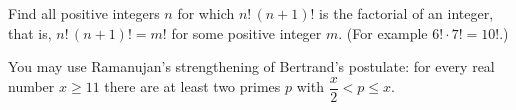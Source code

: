 Find all positive integers $n$ for which $n!\,(n+1)!$ is the factorial of an integer, that is, $n!\,(n+1)!=m!$ for some positive integer $m$. (For example $6!\cdot7!=10!$.)

You may use Ramanujan's strengthening of Bertrand's postulate: for every real number $x\ge11$ there are at least two primes $p$ with $\dfrac {x}{2}<p\le x$.
